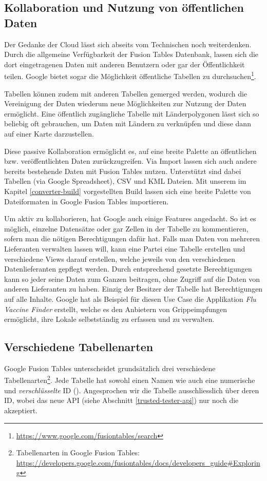 \subsection{Kollaboration und Nutzung von öffentlichen Daten}
Der Gedanke der \gls{Cloud} lässt sich abseits vom Technischen noch weiterdenken. Durch die allgemeine Verfügbarkeit der Fusion Tables Datenbank, lassen sich die dort eingetragenen Daten mit anderen Benutzern oder gar der Öffentlichkeit teilen. Google bietet sogar die Möglichkeit öffentliche Tabellen zu durchsuchen\footnote{\url{https://www.google.com/fusiontables/search}}.

Tabellen können zudem mit anderen Tabellen gemerged werden, wodurch die Vereinigung der Daten wiederum neue Möglichkeiten zur Nutzung der Daten ermöglicht. Eine öffentlich zugängliche Tabelle mit Länderpolygonen lässt sich so beliebig oft gebrauchen, um Daten mit Ländern zu verknüpfen und diese dann auf einer Karte darzustellen.

Diese passive Kollaboration ermöglicht es, auf eine breite Palette an öffentlichen bzw. veröffentlichten Daten zurückzugreifen. Via Import lassen sich auch andere bereits bestehende Daten mit Fusion Tables nutzen. Unterstützt sind dabei Tabellen (via Google Spreadsheet), \gls{CSV} und \gls{KML} Dateien. Mit unserem im Kapitel \ref{converter-build} vorgestellten Build lassen sich eine breite Palette von Dateiformaten in Google Fusion Tables importieren.

Um aktiv zu kollaborieren, hat Google auch einige Features angedacht. So ist es möglich, einzelne Datensätze oder gar Zellen in der Tabelle zu kommentieren, sofern man die nötigen Berechtigungen dafür hat. Falls man Daten von mehreren Lieferanten verwalten lassen will, kann eine Partei eine Tabelle erstellen und verschiedene Views darauf erstellen, welche jeweils von den verschiedenen Datenlieferanten gepflegt werden. Durch entsprechend gesetzte Berechtigungen kann so jeder seine Daten zum Ganzen beitragen, ohne Zugriff auf die Daten von anderen Lieferanten zu haben. Einzig der Besitzer der Tabelle hat Berechtigungen auf alle Inhalte. Google hat als Beispiel für diesen Use Case die Applikation \emph{Flu Vaccine Finder} erstellt, welche es den Anbietern von Grippeimpfungen ermöglicht, ihre Lokale selbstständig zu erfassen und zu verwalten.\cite{data-gathering}

\subsection{Verschiedene Tabellenarten}
Google Fusion Tables unterscheidet grundsätzlich drei verschiedene Tabellenarten\footnote{Tabellenarten in Google Fusion Tables: \url{https://developers.google.com/fusiontables/docs/developers_guide\#Exploring}}. Jede Tabelle hat sowohl einen Namen wie auch eine numerische und \emph{verschlüsselte} ID (). Angesprochen wir die Tabelle ausschliesslich über deren ID, wobei das neue \gls{API} (siehe Abschnitt \ref{trusted-tester-api}) nur noch die  akzeptiert.

